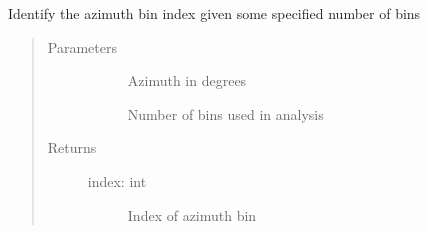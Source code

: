 \documentclass[letterpaper,10pt,english]{sphinxmanual}
\begin{document}
\begin{fulllineitems}
\label{\detokenize{stochprop.propagation:stochprop.propagation.find_azimuth_bin}}
Identify the azimuth bin index given some specified number of bins
\begin{quote}\begin{description}
\item[{Parameters}] \leavevmode\begin{description}
\item[{}] \leavevmode
Azimuth in degrees

\item[{}] \leavevmode
Number of bins used in analysis

\end{description}

\item[{Returns}] \leavevmode\begin{description}
\item[{index: int}] \leavevmode
Index of azimuth bin

\end{description}

\end{description}\end{quote}

\end{fulllineitems}

\end{document}
